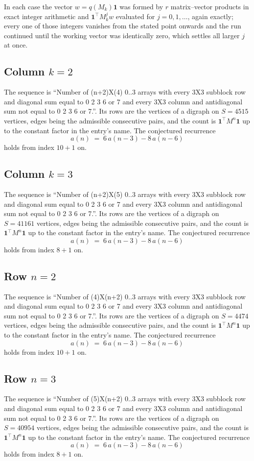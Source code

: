 \documentclass[11pt,a4paper]{article}
\theoremstyle{plain}
\theoremstyle{definition}
\begin{document}
In each case the vector $w=q(M_k)\mathbf{1}$ was formed by $r$ matrix--vector products in
exact integer arithmetic and $\mathbf{1}^{\!\top}M_k^{j}w$ evaluated for $j=0,1,\dots$,
again exactly; every one of those integers vanishes from the stated point onwards and the run
continued until the working vector was identically zero, which settles all larger $j$ at once.

\subsection*{Column $k$$=2$}
The sequence is ``Number of (n+2)X(4) 0..3 arrays with every 3X3 subblock row and diagonal sum equal to 0 2 3 6 or 7 and every 3X3 column and antidiagonal sum not equal to 0 2 3 6 or 7.''. Its rows are the vertices of a digraph on
$S=4515$ vertices, edges being the admissible consecutive pairs, and the count is
$\mathbf{1}^{\!\top}M^{n}\mathbf{1}$ up to the constant factor in the entry's name.
The conjectured recurrence
\[
a(n)\;=\;6\,a(n-3) - 8\,a(n-6)
\]
holds from index $10+1$ on.

\subsection*{Column $k$$=3$}
The sequence is ``Number of (n+2)X(5) 0..3 arrays with every 3X3 subblock row and diagonal sum equal to 0 2 3 6 or 7 and every 3X3 column and antidiagonal sum not equal to 0 2 3 6 or 7.''. Its rows are the vertices of a digraph on
$S=41161$ vertices, edges being the admissible consecutive pairs, and the count is
$\mathbf{1}^{\!\top}M^{n}\mathbf{1}$ up to the constant factor in the entry's name.
The conjectured recurrence
\[
a(n)\;=\;6\,a(n-3) - 8\,a(n-6)
\]
holds from index $8+1$ on.

\subsection*{Row $n$$=2$}
The sequence is ``Number of (4)X(n+2) 0..3 arrays with every 3X3 subblock row and diagonal sum equal to 0 2 3 6 or 7 and every 3X3 column and antidiagonal sum not equal to 0 2 3 6 or 7.''. Its rows are the vertices of a digraph on
$S=4474$ vertices, edges being the admissible consecutive pairs, and the count is
$\mathbf{1}^{\!\top}M^{n}\mathbf{1}$ up to the constant factor in the entry's name.
The conjectured recurrence
\[
a(n)\;=\;6\,a(n-3) - 8\,a(n-6)
\]
holds from index $10+1$ on.

\subsection*{Row $n$$=3$}
The sequence is ``Number of (5)X(n+2) 0..3 arrays with every 3X3 subblock row and diagonal sum equal to 0 2 3 6 or 7 and every 3X3 column and antidiagonal sum not equal to 0 2 3 6 or 7.''. Its rows are the vertices of a digraph on
$S=40954$ vertices, edges being the admissible consecutive pairs, and the count is
$\mathbf{1}^{\!\top}M^{n}\mathbf{1}$ up to the constant factor in the entry's name.
The conjectured recurrence
\[
a(n)\;=\;6\,a(n-3) - 8\,a(n-6)
\]
holds from index $8+1$ on.
\end{document}
